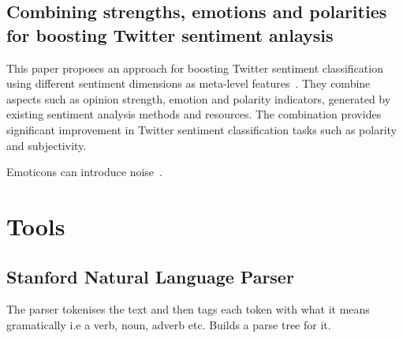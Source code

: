 \subsection{Combining strengths, emotions and polarities for boosting Twitter sentiment anlaysis}
This paper proposes an approach for boosting Twitter sentiment classification using different sentiment dimensions as meta-level features~\cite{combiningstrengthsemotionspolarities}. They combine aspects such as opinion strength, emotion and polarity indicators, generated by existing sentiment analysis methods and resources. The combination provides significant improvement in Twitter sentiment classification tasks such as polarity and subjectivity. 

Emoticons can introduce noise~\cite{combiningstrengthsemotionspolarities}.

\section{Tools}
\subsection{Stanford Natural Language Parser}
The parser tokenises the text and then tags each token with what it means gramatically i.e a verb, noun, adverb etc. Builds a parse tree for it. 